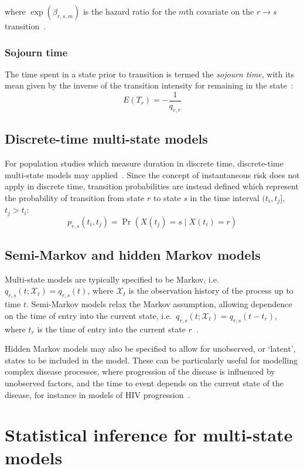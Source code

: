 where $\exp(\beta_{r,s,m})$ is the hazard ratio for the $m$th covariate on the $r \rightarrow s$ transition~\parencite{van-den-Hout2016-xy}.

\subsubsection{Sojourn time}

The time spent in a state prior to transition is termed the \textit{sojourn time}, with its mean given by the inverse of the transition intensity for remaining in the state~\parencite{Jackson2011-ry}:
%
\[
    E(T_r) = -\frac{1}{q_{r,r}}
\]

\subsection{Discrete-time multi-state models}

For population studies which measure duration in discrete time, discrete-time multi-state models may applied~\parencite{Steele2004-ru}. Since the concept of instantaneous risk does not apply in discrete time, transition probabilities are instead defined which represent the probability of transition from state $r$ to state $s$ in the time interval $(t_i,t_j]$, $t_j>t_i$:
%
\[
    p_{r,s}(t_i, t_j) = \Pr(X(t_j) = s \mid X(t_i) = r)
\]

\subsection{Semi-Markov and hidden Markov models}

Multi-state models are typically specified to be Markov, i.e.\ $q_{r,s}(t; \mathcal{X}_t) = q_{r,s}(t)$, where $\mathcal{X}_t$ is the observation history of the process up to time $t$. Semi-Markov models relax the Markov assumption, allowing dependence on the time of entry into the current state, i.e.\ $q_{r,s}(t;\mathcal{X}_t)=q_{r,s}(t-t_r)$, where $t_r$ is the time of entry into the current state $r$~\parencite{Meira-Machado2009-xu}.

Hidden Markov models may also be specified to allow for unobserved, or `latent', states to be included in the model. These can be particularly useful for modelling complex disease processes, where progression of the disease is influenced by unobserved factors, and the time to event depends on the current state of the disease, for instance in models of HIV progression~\parencite{Aalen1997-jh}.

\section{Statistical inference for multi-state models}

